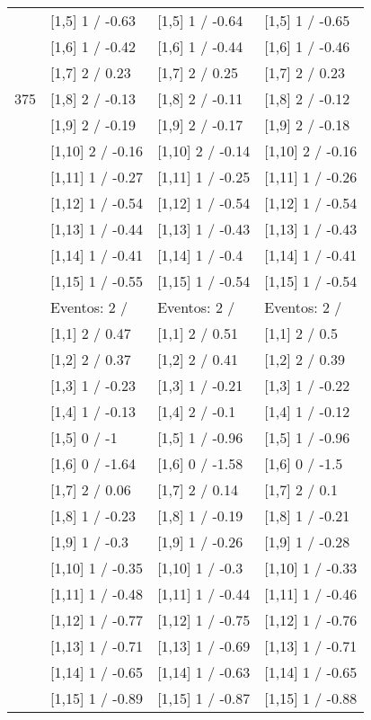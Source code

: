 \begin{table}
\begin{tabular}[t]{llll}
 & {}[1,5] 1  / -0.63 & {}[1,5] 1  / -0.64 & {}[1,5] 1  / -0.65\\
 & {}[1,6] 1  / -0.42 & {}[1,6] 1  / -0.44 & {}[1,6] 1  / -0.46\\
 & {}[1,7] 2  / 0.23 & {}[1,7] 2  / 0.25 & {}[1,7] 2  / 0.23\\
375 & {}[1,8] 2  / -0.13 & {}[1,8] 2  / -0.11 & {}[1,8] 2  / -0.12\\
\addlinespace
 & {}[1,9] 2  / -0.19 & {}[1,9] 2  / -0.17 & {}[1,9] 2  / -0.18\\
 & {}[1,10] 2  / -0.16 & {}[1,10] 2  / -0.14 & {}[1,10] 2  / -0.16\\
 & {}[1,11] 1  / -0.27 & {}[1,11] 1  / -0.25 & {}[1,11] 1  / -0.26\\
 & {}[1,12] 1  / -0.54 & {}[1,12] 1  / -0.54 & {}[1,12] 1  / -0.54\\
 & {}[1,13] 1  / -0.44 & {}[1,13] 1  / -0.43 & {}[1,13] 1  / -0.43\\
\addlinespace
 & {}[1,14] 1  / -0.41 & {}[1,14] 1  / -0.4 & {}[1,14] 1  / -0.41\\
 & {}[1,15] 1  / -0.55 & {}[1,15] 1  / -0.54 & {}[1,15] 1  / -0.54\\
 & Eventos:  2 / & Eventos:  2 / & Eventos:  2 /\\
 & {}[1,1] 2  / 0.47 & {}[1,1] 2  / 0.51 & {}[1,1] 2  / 0.5\\
 & {}[1,2] 2  / 0.37 & {}[1,2] 2  / 0.41 & {}[1,2] 2  / 0.39\\
\addlinespace
 & {}[1,3] 1  / -0.23 & {}[1,3] 1  / -0.21 & {}[1,3] 1  / -0.22\\
 & {}[1,4] 1  / -0.13 & {}[1,4] 2  / -0.1 & {}[1,4] 1  / -0.12\\
 & {}[1,5] 0  / -1 & {}[1,5] 1  / -0.96 & {}[1,5] 1  / -0.96\\
 & {}[1,6] 0  / -1.64 & {}[1,6] 0  / -1.58 & {}[1,6] 0  / -1.5\\
 & {}[1,7] 2  / 0.06 & {}[1,7] 2  / 0.14 & {}[1,7] 2  / 0.1\\
\addlinespace
500 & {}[1,8] 1  / -0.23 & {}[1,8] 1  / -0.19 & {}[1,8] 1  / -0.21\\
 & {}[1,9] 1  / -0.3 & {}[1,9] 1  / -0.26 & {}[1,9] 1  / -0.28\\
 & {}[1,10] 1  / -0.35 & {}[1,10] 1  / -0.3 & {}[1,10] 1  / -0.33\\
 & {}[1,11] 1  / -0.48 & {}[1,11] 1  / -0.44 & {}[1,11] 1  / -0.46\\
 & {}[1,12] 1  / -0.77 & {}[1,12] 1  / -0.75 & {}[1,12] 1  / -0.76\\
\addlinespace
 & {}[1,13] 1  / -0.71 & {}[1,13] 1  / -0.69 & {}[1,13] 1  / -0.71\\
 & {}[1,14] 1  / -0.65 & {}[1,14] 1  / -0.63 & {}[1,14] 1  / -0.65\\
 & {}[1,15] 1  / -0.89 & {}[1,15] 1  / -0.87 & {}[1,15] 1  / -0.88\\
\bottomrule
\end{tabular}
\end{table}
